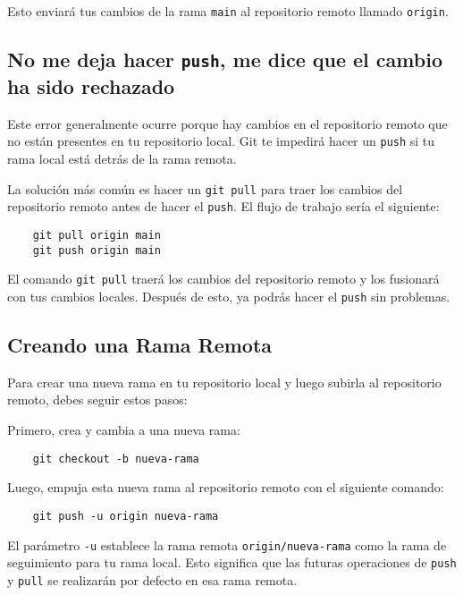         Esto enviar\'a tus cambios de la rama \texttt{main} al repositorio remoto llamado \texttt{origin}.


    \subsection{No me deja hacer \texttt{push}, me dice que el cambio ha sido rechazado}

        Este error generalmente ocurre porque hay cambios en el repositorio remoto que no est\'an presentes en tu repositorio local. Git te impedir\'a hacer un \texttt{push} si tu rama local est\'a detr\'as de la rama remota.

        La soluci\'on m\'as com\'un es hacer un \texttt{git pull} para traer los cambios del repositorio remoto antes de hacer el \texttt{push}. El flujo de trabajo ser\'ia el siguiente:

        \begin{lstlisting}
    git pull origin main
    git push origin main
        \end{lstlisting}

        El comando \texttt{git pull} traer\'a los cambios del repositorio remoto y los fusionar\'a con tus cambios locales. Despu\'es de esto, ya podr\'as hacer el \texttt{push} sin problemas.


    \subsection{Creando una Rama Remota}

        Para crear una nueva rama en tu repositorio local y luego subirla al repositorio remoto, debes seguir estos pasos:

        Primero, crea y cambia a una nueva rama:

        \begin{lstlisting}
    git checkout -b nueva-rama
        \end{lstlisting}

        Luego, empuja esta nueva rama al repositorio remoto con el siguiente comando:

        \begin{lstlisting}
    git push -u origin nueva-rama
        \end{lstlisting}

        El par\'ametro \texttt{-u} establece la rama remota \texttt{origin/nueva-rama} como la rama de seguimiento para tu rama local. Esto significa que las futuras operaciones de \texttt{push} y \texttt{pull} se realizar\'an por defecto en esa rama remota.



